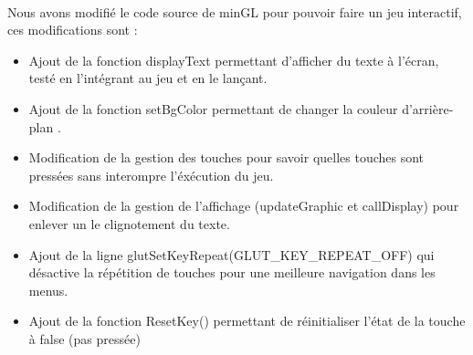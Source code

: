 \documentclass{article}
\begin{document}
\paragraph{} Nous avons modifié le code source de minGL pour pouvoir faire un jeu interactif, ces modifications sont :
\begin{itemize}
    \item Ajout de la fonction displayText permettant d'afficher du texte à l'écran, testé en l'intégrant au jeu et en le lançant.
    \item Ajout de la fonction setBgColor permettant de changer la couleur d'arrière-plan .
    \item Modification de la gestion des touches pour savoir quelles touches sont pressées sans interompre l'éxécution du jeu.
    \item Modification de la gestion de l'affichage (updateGraphic et callDisplay) pour enlever un le clignotement du texte.
    \item Ajout de la ligne glutSetKeyRepeat(GLUT\_KEY\_REPEAT\_OFF) qui désactive la répétition de touches pour une meilleure navigation dans les menus.
    \item Ajout de la fonction ResetKey() permettant de réinitialiser l'état de la touche à false (pas pressée)
\end{itemize}
\end{document}
